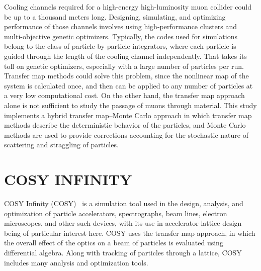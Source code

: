 \documentclass{jacow}
\begin{document}

Cooling channels required for a high-energy high-luminosity muon collider could be up to a thousand meters long. Designing, simulating, and optimizing performance of those channels involves using high-performance clusters and multi-objective genetic optimizers. Typically, the codes used for simulations belong to the class of particle-by-particle integrators, where each particle is guided through the length of the cooling channel independently. That takes its toll on genetic optimizers, especially with a large number of particles per run. Transfer map methods could solve this problem, since the nonlinear map of the system is calculated once, and then can be applied to any number of particles at a very low computational cost. On the other hand, the transfer map approach alone is not sufficient to study the passage of muons through material. This study implements a hybrid transfer map--Monte Carlo approach in which transfer map methods describe the deterministic behavior of the particles, and Monte Carlo methods are used to provide corrections accounting for the stochastic nature of scattering and straggling of particles. %

\section{COSY INFINITY}

COSY Infinity (COSY)~\cite{COSY} is a simulation tool used in the design, analysis, and optimization of particle accelerators, spectrographs, beam lines, electron microscopes, and other such devices, with its use in accelerator lattice design being of particular interest here. COSY uses the transfer map approach, in which the overall effect of the optics on a beam of particles is evaluated using differential algebra. Along with tracking of particles through a lattice, COSY includes many analysis and optimization tools. %
\end{document}
